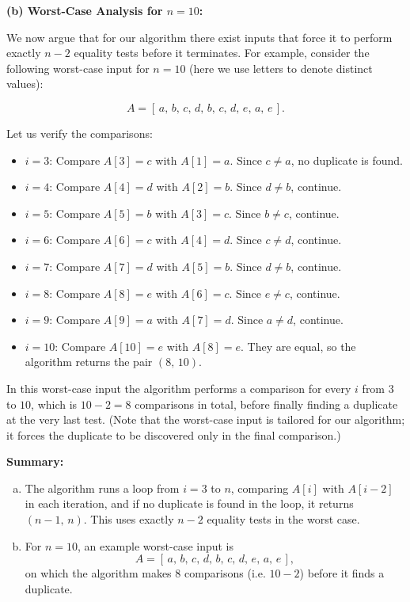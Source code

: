 \documentclass[11pt]{article}
\begin{document}
    \medskip
    
    \textbf{(b) Worst-Case Analysis for \(n=10\):}
    
    We now argue that for our algorithm there exist inputs that force it to perform exactly \(n-2\) equality tests before it terminates. For example, consider the following worst-case input for \(n=10\) (here we use letters to denote distinct values):
    
    \[
    A = [\, a,\, b,\, c,\, d,\, b,\, c,\, d,\, e,\, a,\, e \,].
    \]
    
    Let us verify the comparisons:
    \begin{itemize}
        \item \(i=3\): Compare \(A[3]=c\) with \(A[1]=a\). Since \(c \neq a\), no duplicate is found.
        \item \(i=4\): Compare \(A[4]=d\) with \(A[2]=b\). Since \(d \neq b\), continue.
        \item \(i=5\): Compare \(A[5]=b\) with \(A[3]=c\). Since \(b \neq c\), continue.
        \item \(i=6\): Compare \(A[6]=c\) with \(A[4]=d\). Since \(c \neq d\), continue.
        \item \(i=7\): Compare \(A[7]=d\) with \(A[5]=b\). Since \(d \neq b\), continue.
        \item \(i=8\): Compare \(A[8]=e\) with \(A[6]=c\). Since \(e \neq c\), continue.
        \item \(i=9\): Compare \(A[9]=a\) with \(A[7]=d\). Since \(a \neq d\), continue.
        \item \(i=10\): Compare \(A[10]=e\) with \(A[8]=e\). They are equal, so the algorithm returns the pair \((8,\, 10)\).
    \end{itemize}
    
    In this worst-case input the algorithm performs a comparison for every \(i\) from \(3\) to \(10\), which is \(10-2=8\) comparisons in total, before finally finding a duplicate at the very last test. (Note that the worst-case input is tailored for our algorithm; it forces the duplicate to be discovered only in the final comparison.)
    
    \bigskip
    
    \textbf{Summary:}  
    \begin{enumerate}[(a)]
        \item The algorithm runs a loop from \(i=3\) to \(n\), comparing \(A[i]\) with \(A[i-2]\) in each iteration, and if no duplicate is found in the loop, it returns \((n-1,\, n)\). This uses exactly \(n-2\) equality tests in the worst case.
        \item For \(n=10\), an example worst-case input is 
        \[
        A = [\, a,\, b,\, c,\, d,\, b,\, c,\, d,\, e,\, a,\, e \,],
        \]
        on which the algorithm makes \(8\) comparisons (i.e. \(10-2\)) before it finds a duplicate.
    \end{enumerate}
\end{document}
